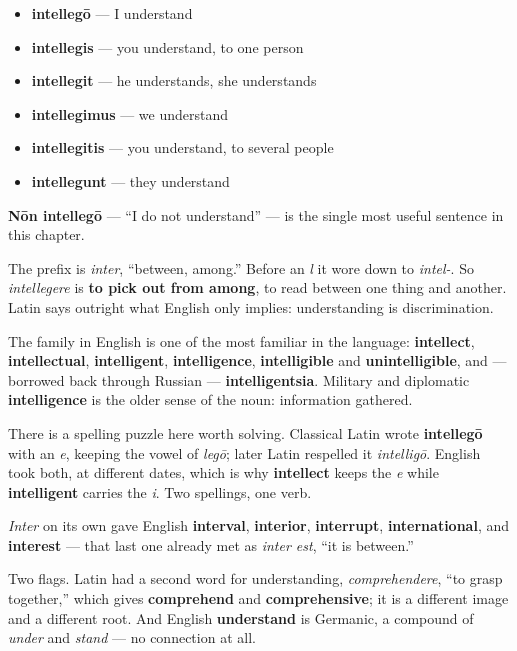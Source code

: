 \begin{itemize}
\raggedright
  \item \textbf{intellegō} — I understand
  \item \textbf{intellegis} — you understand, to one person
  \item \textbf{intellegit} — he understands, she understands
  \item \textbf{intellegimus} — we understand
  \item \textbf{intellegitis} — you understand, to several people
  \item \textbf{intellegunt} — they understand
\end{itemize}

\textbf{Nōn intellegō} — \textquotedblleft{}I do not understand\textquotedblright{} — is the single most useful sentence in this chapter.

\begin{cousinweb}
The prefix is \emph{inter}, \textquotedblleft{}between, among.\textquotedblright{} Before an \emph{l} it wore down to \emph{intel-}. So \emph{intellegere} is \textbf{to pick out from among}, to read between one thing and another. Latin says outright what English only implies: understanding is discrimination.

The family in English is one of the most familiar in the language: \textbf{intellect}, \textbf{intellectual}, \textbf{intelligent}, \textbf{intelligence}, \textbf{intelligible} and \textbf{unintelligible}, and — borrowed back through Russian — \textbf{intelligentsia}. Military and diplomatic \textbf{intelligence} is the older sense of the noun: information gathered.

There is a spelling puzzle here worth solving. Classical Latin wrote \textbf{intellegō} with an \emph{e}, keeping the vowel of \emph{legō}; later Latin respelled it \emph{intelligō}. English took both, at different dates, which is why \textbf{intellect} keeps the \emph{e} while \textbf{intelligent} carries the \emph{i}. Two spellings, one verb.

\emph{Inter} on its own gave English \textbf{interval}, \textbf{interior}, \textbf{interrupt}, \textbf{international}, and \textbf{interest} — that last one already met as \emph{inter est}, \textquotedblleft{}it is between.\textquotedblright{}

Two flags. Latin had a second word for understanding, \emph{comprehendere}, \textquotedblleft{}to grasp together,\textquotedblright{} which gives \textbf{comprehend} and \textbf{comprehensive}; it is a different image and a different root. And English \textbf{understand} is Germanic, a compound of \emph{under} and \emph{stand} — no connection at all.
\end{cousinweb}

